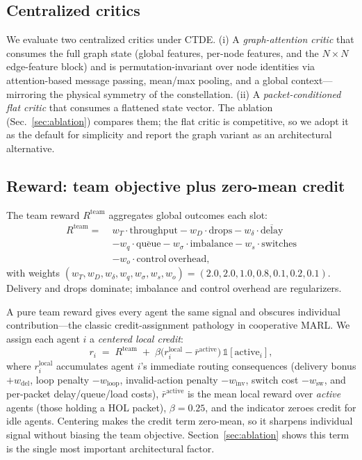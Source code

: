 \documentclass[conference,10pt]{IEEEtran}
\begin{document}
\subsection{Centralized critics}
We evaluate two centralized critics under CTDE. (i) A \emph{graph-attention critic} that consumes the full graph state (global features, per-node features, and the $N\times N$ edge-feature block) and is permutation-invariant over node identities via attention-based message passing, mean/max pooling, and a global context---mirroring the physical symmetry of the constellation. (ii) A \emph{packet-conditioned flat critic} that consumes a flattened state vector. The ablation (Sec.~\ref{sec:ablation}) compares them; the flat critic is competitive, so we adopt it as the default for simplicity and report the graph variant as an architectural alternative.

\subsection{Reward: team objective plus zero-mean credit}
The team reward $R^{\mathrm{team}}$ aggregates global outcomes each slot:
\begin{equation}
\begin{aligned}
R^{\mathrm{team}} =\;& w_T\!\cdot\!\mathrm{throughput} - w_D\!\cdot\!\mathrm{drops} - w_\delta\!\cdot\!\overline{\mathrm{delay}} \\
                 &- w_q\!\cdot\!\overline{\mathrm{queue}} - w_\sigma\!\cdot\!\mathrm{imbalance} - w_s\!\cdot\!\mathrm{switches} \\
                 &- w_o\!\cdot\!\mathrm{control\ overhead},
\end{aligned}
\label{eq:team}
\end{equation}
with weights $(w_T,w_D,w_\delta,w_q,w_\sigma,w_s,w_o)=(2.0,2.0,1.0,0.8,0.1,0.2,0.1)$. Delivery and drops dominate; imbalance and control overhead are regularizers.

A pure team reward gives every agent the same signal and obscures individual contribution---the classic credit-assignment pathology in cooperative MARL. We assign each agent $i$ a \emph{centered local credit}:
\begin{equation}
  r_i \;=\; R^{\mathrm{team}} \;+\; \beta\bigl(r_i^{\mathrm{local}} - \bar{r}^{\mathrm{active}}\bigr)\,\mathbb{1}[\mathrm{active}_i],
  \label{eq:credit}
\end{equation}
where $r_i^{\mathrm{local}}$ accumulates agent $i$'s immediate routing consequences (delivery bonus $+w_{\mathrm{del}}$, loop penalty $-w_{\mathrm{loop}}$, invalid-action penalty $-w_{\mathrm{inv}}$, switch cost $-w_{\mathrm{sw}}$, and per-packet delay/queue/load costs), $\bar{r}^{\mathrm{active}}$ is the mean local reward over \emph{active} agents (those holding a HOL packet), $\beta=0.25$, and the indicator zeroes credit for idle agents. Centering makes the credit term zero-mean, so it sharpens individual signal without biasing the team objective. Section~\ref{sec:ablation} shows this term is the single most important architectural factor.
\end{document}

